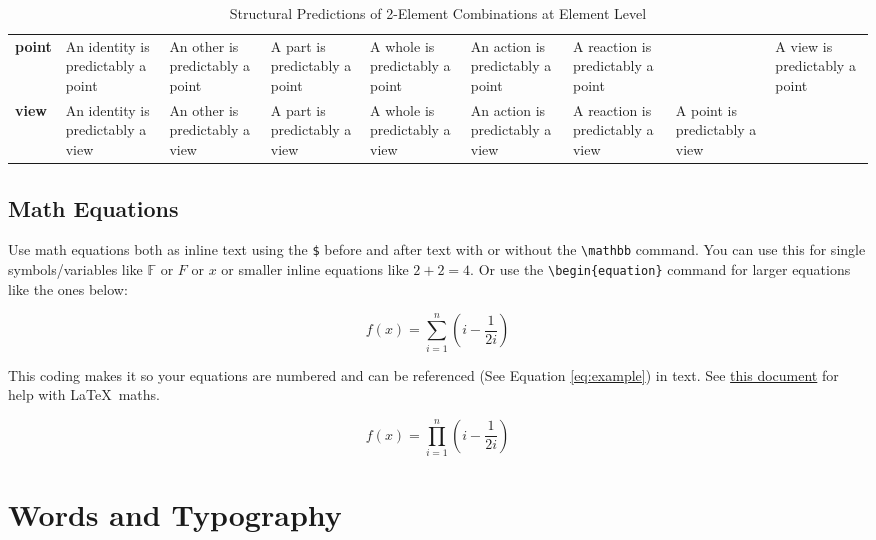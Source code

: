 \documentclass{tufte-handout}
\begin{document}
\begin{table}
\begin{tabular} {M{15mm}M{15mm} M{15mm}M{15mm}M{15mm}M{15mm}M{15mm}M{15mm}M{15mm}}
\textbf{point} & An identity is predictably a point & An other is predictably a point & A part is predictably a point & A whole is predictably a point & An action is predictably a point & A reaction is predictably a point &  & A view is predictably a point\\

\textbf{view} & An identity is predictably a view & An other is predictably a view & A part is predictably a view & A whole is predictably a view & An action is predictably a view & A reaction is predictably a view & A point is predictably  a view & \\
 \bottomrule
\end{tabular}
\caption{Structural Predictions of 2-Element Combinations at Element Level}
\label{table:elements}
\end{table}


\subsection{Math Equations}\label{sec:math} 
Use math equations both as inline text using the \verb|$| before and after text with or without the \verb|\mathbb| command. You can use this for single symbols/variables like $\mathbb{F}$ or $F$ or $x$ or smaller inline equations like ${2+2=4}$. Or use the \verb|\begin{equation}| command for larger equations like the ones below:

\begin{equation}
f(x)=\sum_{i=1}^{n}\left(i-\frac{1}{2i}\right)
\end{equation}

This coding makes it so your equations are numbered and can be referenced (See Equation \ref{eq:example}) in text. See \href{https://ctan.math.utah.edu/ctan/tex-archive/obsolete/info/math/voss/mathmode/Mathmode.pdf}{this document} for help with \LaTeX\ maths. 

\begin{equation}
f(x)=\prod_{i=1}^{n}\left(i-\frac{1}{2i}\right)
\label{eq:example}
\end{equation}




\section{Words and Typography}\label{sec:typography}
\end{document}
